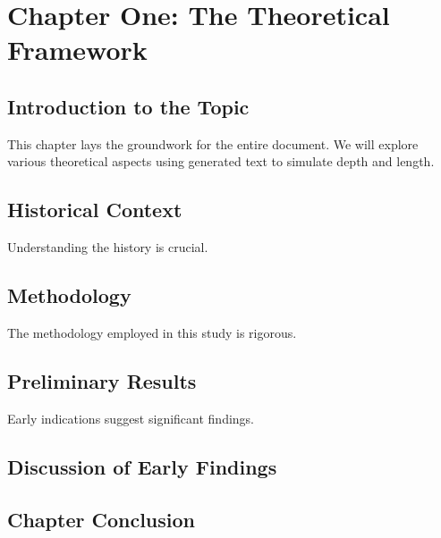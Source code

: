 \section{Chapter One: The Theoretical Framework}

\subsection{Introduction to the Topic}
This chapter lays the groundwork for the entire document. We will explore various theoretical aspects using generated text to simulate depth and length.

\lipsum[1-5]

\subsection{Historical Context}
Understanding the history is crucial.

\lipsum[6-15]

\subsection{Methodology}
The methodology employed in this study is rigorous.

\lipsum[16-25]

\subsection{Preliminary Results}
Early indications suggest significant findings.

\lipsum[26-35]

\subsection{Discussion of Early Findings}
\lipsum[36-45]

\subsection{Chapter Conclusion}
\lipsum[46-50]